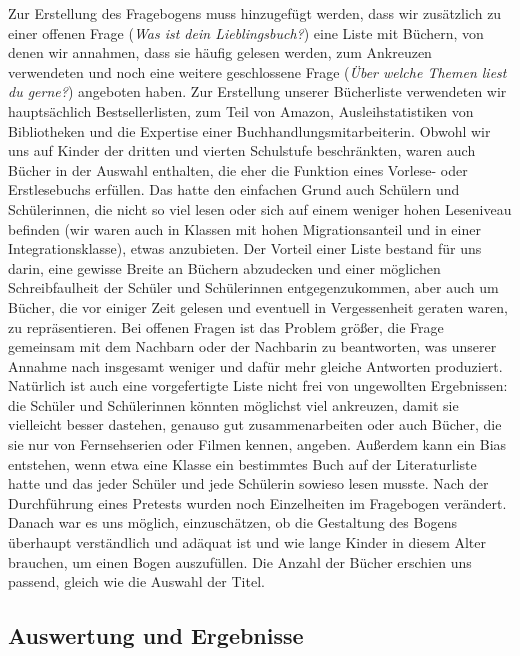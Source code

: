 Zur Erstellung des Fragebogens muss hinzugefügt werden, dass wir
zusätzlich zu einer offenen Frage (\emph{Was ist dein Lieblingsbuch?})
eine Liste mit Büchern, von denen wir annahmen, dass sie häufig gelesen
werden, zum Ankreuzen verwendeten und noch eine weitere geschlossene
Frage (\emph{Über welche Themen liest du gerne?}) angeboten haben. Zur
Erstellung unserer Bücherliste verwendeten wir hauptsächlich
Bestsellerlisten, zum Teil von Amazon, Ausleihstatistiken von
Bibliotheken und die Expertise einer Buchhandlungsmitarbeiterin. Obwohl
wir uns auf Kinder der dritten und vierten Schulstufe beschränkten,
waren auch Bücher in der Auswahl enthalten, die eher die Funktion eines
Vorlese- oder Erstlesebuchs erfüllen. Das hatte den einfachen Grund auch
Schülern und Schülerinnen, die nicht so viel lesen oder sich auf einem
weniger hohen Leseniveau befinden (wir waren auch in Klassen mit hohen
Migrationsanteil und in einer Integrationsklasse), etwas anzubieten. Der
Vorteil einer Liste bestand für uns darin, eine gewisse Breite an
Büchern abzudecken und einer möglichen Schreibfaulheit der Schüler und
Schülerinnen entgegenzukommen, aber auch um Bücher, die vor einiger Zeit
gelesen und eventuell in Vergessenheit geraten waren, zu repräsentieren.
Bei offenen Fragen ist das Problem größer, die Frage gemeinsam mit dem
Nachbarn oder der Nachbarin zu beantworten, was unserer Annahme nach
insgesamt weniger und dafür mehr gleiche Antworten produziert. Natürlich
ist auch eine vorgefertigte Liste nicht frei von ungewollten
Ergebnissen: die Schüler und Schülerinnen könnten möglichst viel
ankreuzen, damit sie vielleicht besser dastehen, genauso gut
zusammenarbeiten oder auch Bücher, die sie nur von Fernsehserien oder
Filmen kennen, angeben. Außerdem kann ein Bias entstehen, wenn etwa eine
Klasse ein bestimmtes Buch auf der Literaturliste hatte und das jeder
Schüler und jede Schülerin sowieso lesen musste. Nach der Durchführung
eines Pretests wurden noch Einzelheiten im Fragebogen verändert. Danach
war es uns möglich, einzuschätzen, ob die Gestaltung des Bogens
überhaupt verständlich und adäquat ist und wie lange Kinder in diesem
Alter brauchen, um einen Bogen auszufüllen. Die Anzahl der Bücher
erschien uns passend, gleich wie die Auswahl der Titel.

\subsection{Auswertung und Ergebnisse}


